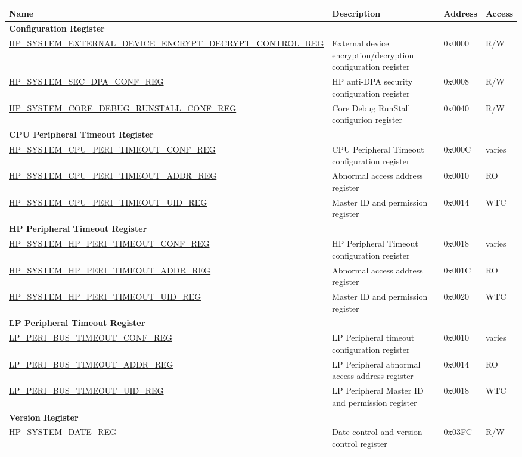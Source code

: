 \begin{longtable}{ | p{12cm} | p{7.2cm} | p{1.3cm} | p{1cm} | }
\hline\rowcolor{lightgray}
Name & Description &  Address & Access \\ \hline
\endhead
\multicolumn{4}{|l|}{\textbf{Configuration Register}} \\ \hline
\hyperref[regdesc:HPSYSTEMEXTERNALDEVICEENCRYPTDECRYPTCONTROLREG]{HP\_SYSTEM\_EXTERNAL\_DEVICE\_ENCRYPT\_DECRYPT\_CONTROL\_REG} & External device encryption/decryption configuration register & 0x0000 & R/W \\ \hline
\hyperref[regdesc:HPSYSTEMSECDPACONFREG]{HP\_SYSTEM\_SEC\_DPA\_CONF\_REG} & HP anti-DPA security configuration register & 0x0008 & R/W \\ \hline
\hyperref[regdesc:HPSYSTEMCOREDEBUGRUNSTALLCONFREG]{HP\_SYSTEM\_CORE\_DEBUG\_RUNSTALL\_CONF\_REG} & Core Debug RunStall configurion register & 0x0040 & R/W \\ \hline
\multicolumn{4}{|l|}{\textbf{CPU Peripheral Timeout Register}} \\ \hline
\hyperref[regdesc:HPSYSTEMCPUPERITIMEOUTCONFREG]{HP\_SYSTEM\_CPU\_PERI\_TIMEOUT\_CONF\_REG} & CPU Peripheral Timeout configuration register & 0x000C & varies \\ \hline
\hyperref[regdesc:HPSYSTEMCPUPERITIMEOUTADDRREG]{HP\_SYSTEM\_CPU\_PERI\_TIMEOUT\_ADDR\_REG} & Abnormal access address register & 0x0010 & RO \\ \hline
\hyperref[regdesc:HPSYSTEMCPUPERITIMEOUTUIDREG]{HP\_SYSTEM\_CPU\_PERI\_TIMEOUT\_UID\_REG} & Master ID and permission register & 0x0014 & WTC \\ \hline
\multicolumn{4}{|l|}{\textbf{HP Peripheral Timeout Register}} \\ \hline
\hyperref[regdesc:HPSYSTEMHPPERITIMEOUTCONFREG]{HP\_SYSTEM\_HP\_PERI\_TIMEOUT\_CONF\_REG} & HP Peripheral Timeout configuration register & 0x0018 & varies \\ \hline
\hyperref[regdesc:HPSYSTEMHPPERITIMEOUTADDRREG]{HP\_SYSTEM\_HP\_PERI\_TIMEOUT\_ADDR\_REG} & Abnormal access address register & 0x001C & RO \\ \hline
\hyperref[regdesc:HPSYSTEMHPPERITIMEOUTUIDREG]{HP\_SYSTEM\_HP\_PERI\_TIMEOUT\_UID\_REG} & Master ID and permission register & 0x0020 & WTC \\ \hline
\multicolumn{4}{|l|}{\textbf{LP Peripheral Timeout Register}} \\ \hline
\hyperref[regdesc:LPPERIBUSTIMEOUTCONFREG]{LP\_PERI\_BUS\_TIMEOUT\_CONF\_REG} & LP Peripheral timeout configuration register & 0x0010 & varies \\ \hline
\hyperref[regdesc:LPPERIBUSTIMEOUTADDRREG]{LP\_PERI\_BUS\_TIMEOUT\_ADDR\_REG} & LP Peripheral  abnormal access address register & 0x0014 & RO \\ \hline
\hyperref[regdesc:LPPERIBUSTIMEOUTUIDREG]{LP\_PERI\_BUS\_TIMEOUT\_UID\_REG} & LP Peripheral Master ID and permission register & 0x0018 & WTC \\ \hline
\multicolumn{4}{|l|}{\textbf{Version Register}} \\ \hline
\hyperref[regdesc:HPSYSTEMDATEREG]{HP\_SYSTEM\_DATE\_REG} & Date control and version control register & 0x03FC & R/W \\ \hline
\end{longtable}

